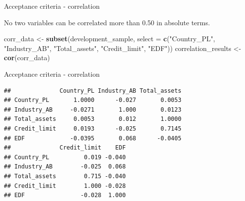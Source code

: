 \documentclass[9pt,ignorenonframetext,]{beamer}
\newenvironment{Shaded}{\begin{snugshade}}{\end{snugshade}}
\newcommand{\KeywordTok}[1]{\textcolor[rgb]{0.13,0.29,0.53}{\textbf{#1}}}
\newcommand{\DataTypeTok}[1]{\textcolor[rgb]{0.13,0.29,0.53}{#1}}
\newcommand{\StringTok}[1]{\textcolor[rgb]{0.31,0.60,0.02}{#1}}
\newcommand{\NormalTok}[1]{#1}
\begin{document}
\begin{frame}[fragile]{Acceptance criteria - correlation}

No two variables can be correlated more than 0.50 in absolute terms.

\begin{Shaded}
\begin{Highlighting}[]
\NormalTok{corr_data <-}\StringTok{ }\KeywordTok{subset}\NormalTok{(development_sample,}
                    \DataTypeTok{select =} \KeywordTok{c}\NormalTok{(}\StringTok{"Country_PL"}\NormalTok{,}
                               \StringTok{"Industry_AB"}\NormalTok{,}
                               \StringTok{"Total_assets"}\NormalTok{,}
                               \StringTok{"Credit_limit"}\NormalTok{,}
                               \StringTok{"EDF"}\NormalTok{))}
\NormalTok{correlation_results <-}\StringTok{ }\KeywordTok{cor}\NormalTok{(corr_data)}
\end{Highlighting}
\end{Shaded}

\end{frame}

\begin{frame}[fragile]{Acceptance criteria - correlation}

\begin{verbatim}
##              Country_PL Industry_AB Total_assets
## Country_PL       1.0000      -0.027       0.0053
## Industry_AB     -0.0271       1.000       0.0123
## Total_assets     0.0053       0.012       1.0000
## Credit_limit     0.0193      -0.025       0.7145
## EDF             -0.0395       0.068      -0.0405
##              Credit_limit    EDF
## Country_PL          0.019 -0.040
## Industry_AB        -0.025  0.068
## Total_assets        0.715 -0.040
## Credit_limit        1.000 -0.028
## EDF                -0.028  1.000
\end{verbatim}

\end{frame}
\end{document}
